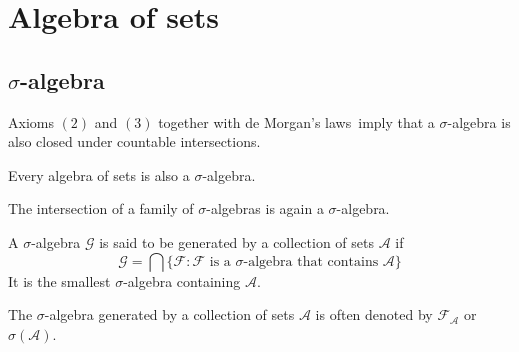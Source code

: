 \section{Algebra of sets}
	
	
\subsection{\texorpdfstring{$\sigma$}{sigma}-algebra}
    
	\begin{remark}
    		Axioms $(2)$ and $(3)$ together with de Morgan's laws\footnotemark\ imply that a $\sigma$-algebra is also closed under countable intersections.
	\end{remark}
	
	\begin{result}
		Every algebra of sets is also a $\sigma$-algebra.
	\end{result}
    
	\begin{property}
		The intersection of a family of $\sigma$-algebras is again a $\sigma$-algebra.
	\end{property}
    
	\begin{definition}
		A $\sigma$-algebra $\mathcal{G}$ is said to be generated by a collection of sets $\mathcal{A}$ if
        	\begin{equation}
			\label{set:generated_sigma_algebra}
        		\mathcal{G} = \bigcap\{\mathcal{F}:\mathcal{F} \text{ is a } \sigma\text{-algebra that contains } \mathcal{A}\}
		\end{equation}
	        It is the smallest $\sigma$-algebra containing $\mathcal{A}$.
	\end{definition}
	\begin{notation}\label{set:notation:generated_sigma_algebra}
		The $\sigma$-algebra generated by a collection of sets $\mathcal{A}$ is often denoted by $\mathcal{F}_\mathcal{A}$ or $\sigma(\mathcal{A})$.
	\end{notation}
    
